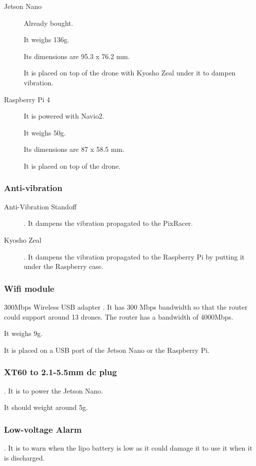 \begin{description}
    \item[Jetson Nano] Already bought.

          It weighs 136g.

          Its dimensions are 95.3 x 76.2 mm.

          It is placed on top of the drone with Kyosho Zeal under it to dampen vibration.

    \item[Raspberry Pi 4] It is powered with Navio2.

          It weighs 50g.

          Its dimensions are 87 x 58.5 mm.

          It is placed on top of the drone.
\end{description}

\subsubsection{Anti-vibration}
\begin{description}
    \item[Anti-Vibration Standoff] \cite{bangood_standoff}. It dampens the vibration propagated to the PixRacer.
    \item[Kyosho Zeal] \cite{amazon_kyosho}. It dampens the vibration propagated to the Raspberry Pi by putting it under the Raspberry case.
\end{description}

\subsubsection{Wifi module}
300Mbps Wireless USB adapter \cite{amazon_panda_wifi_module}. It has 300 Mbps bandwidth so that the router could support around 13 drones. The router has a bandwidth of 4000Mbps.

It weighs 9g.

It is placed on a USB port of the Jetson Nano or the Raspberry Pi.

\subsubsection{XT60 to 2.1-5.5mm dc plug}
\cite{bangood_xt60_connector}. It is to power the Jetson Nano.

It should weight around 5g.

\subsubsection{Low-voltage Alarm}
\cite{bangood_battery_monitor}. It is to warn when the lipo battery is low as it could damage it to use it when it is discharged.

